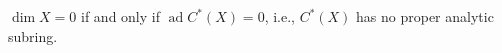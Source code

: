 $\dim X = 0$ if and only if $\operatorname{ad} C^*(X) = 0$, i.e., $C^*(X)$ has no proper analytic subring.
